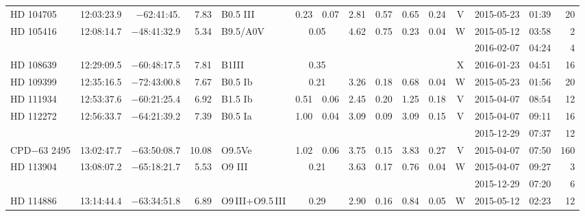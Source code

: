 \begin{tiny}
\begin{longtable}{lrrrll@{$\,\pm$\,}rl@{$\,\pm$\,}rl@{$\,\pm$\,}rcrrr}
HD 104705     &12:03:23.9&  $-$62:41:45. &        7.83&  B0.5 III       & 0.23 & 0.07   &    2.81 & 0.57 &      0.65 & 0.24 &    V  &2015-05-23 &01:39&   20\\  %
HD 105416     &12:08:14.7&  $-$48:41:32.9&        5.34&  B9.5/A0V&\multicolumn{2}{c}{0.05}&  4.62 & 0.75 &      0.23 & 0.04 &    W  &2015-05-12 &03:58&    2\\  %
              &          &               &            &                 & \multicolumn{6}{c}{}                              &       &2016-02-07 &04:24&    4\\ %
HD 108639     &12:29:09.5&  $-$60:48:17.5&        7.81&  B1III&\multicolumn{2}{c}{0.35}&\multicolumn{2}{c}{}&\multicolumn{2}{c}{}&X&2016-01-23 &04:51&   16\\  %
HD 109399     &12:35:16.5&  $-$72:43:00.8&        7.67&  B0.5 Ib&\multicolumn{2}{c}{0.21}&   3.26 & 0.18 &      0.68 & 0.04 &    W  &2015-05-23 &01:56&   20\\  %
HD 111934     &12:53:37.6&  $-$60:21:25.4&        6.92&  B1.5 Ib        & 0.51 & 0.06   &    2.45 & 0.20 &      1.25 & 0.18 &    V  &2015-04-07 &08:54&   12\\  %
HD 112272     &12:56:33.7&  $-$64:21:39.2&        7.39&  B0.5 Ia        & 1.00 & 0.04   &    3.09 & 0.09 &      3.09 & 0.15 &    V  &2015-04-07 &09:11&   16\\  %
              &          &               &            &                 & \multicolumn{6}{c}{}                              &       &2015-12-29 &07:37&   12\\  %
CPD$-$63 2495 &13:02:47.7&  $-$63:50:08.7&       10.08&  O9.5Ve         & 1.02 & 0.06   &    3.75 & 0.15 &      3.83 & 0.27 &    V  &2015-04-07 &07:50&  160\\  %
HD 113904     &13:08:07.2&  $-$65:18:21.7&        5.53&  O9 III&\multicolumn{2}{c}{0.21}&    3.63 & 0.17 &      0.76 & 0.04 &    W  &2015-04-07 &09:27&    3\\  %
              &          &               &            &                 & \multicolumn{6}{c}{}                              &       &2015-12-29 &07:20&    6\\  %
HD 114886     &13:14:44.4&  $-$63:34:51.8&        6.89&O9\,III+O9.5\,III&\multicolumn{2}{c}{0.29}&2.90&0.16&    0.84 & 0.05 &    W  &2015-05-12 &02:23&   12\\  %

\end{longtable}
\end{tiny}
